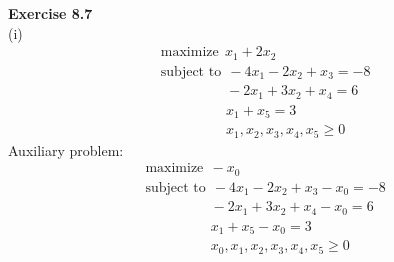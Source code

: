 \documentclass[letterpaper,12pt]{article}
\theoremstyle{definition}
\begin{document}
\textbf{Exercise 8.7} \\
(i)
\begin{align*}
  &\text{maximize} \ \ x_1 + 2x_2 \\
  &\text{subject to} \ \ -4x_1 - 2x_2 + x_3 = -8 \\
  &\qquad \qquad \ \ \  -2x_1 + 3x_2 + x_4 = 6 \\
  &\qquad \qquad \ \ \  x_1 + x_5 = 3 \\
  &\qquad \qquad \ \ \  x_1, x_2, x_3, x_4, x_5 \geq 0
\end{align*}
Auxiliary problem:
\begin{align*}
  &\text{maximize} \ \ -x_0 \\
  &\text{subject to} \ \ -4x_1 - 2x_2 + x_3 - x_0 = -8 \\
  &\qquad \qquad \ \ \ -2x_1 + 3x_2 + x_4 - x_0 = 6 \\
  &\qquad \qquad \ \ \ x_1 + x_5 - x_0 = 3 \\
  &\qquad \qquad \ \ \  x_0, x_1, x_2, x_3, x_4, x_5 \geq 0
\end{align*}
\end{document}
